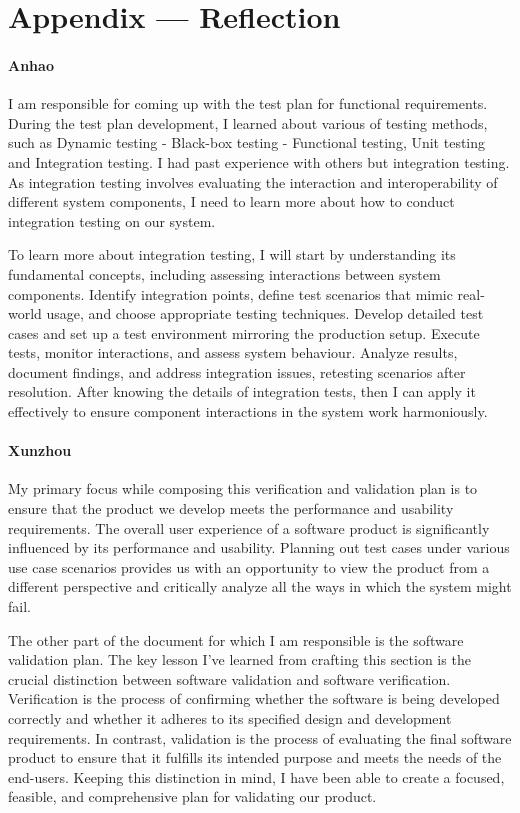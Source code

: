 \documentclass[12pt, titlepage]{article}
\begin{document}
\newpage{}
\section*{Appendix --- Reflection}

\paragraph*{Anhao}
I am responsible for coming up with the test plan for functional requirements.
During the test plan development, I learned about various of testing methods,
such as Dynamic testing - Black-box testing - Functional testing, Unit testing
and Integration testing. I had past experience with others but integration
testing. As integration testing involves evaluating the interaction and
interoperability of different system components, I need to learn more about how
to conduct integration testing on our system.

To learn more about integration testing, I will start by understanding its
fundamental concepts, including assessing interactions between system
components. Identify integration points, define test scenarios that mimic
real-world usage, and choose appropriate testing techniques. Develop detailed
test cases and set up a test environment mirroring the production setup. Execute
tests, monitor interactions, and assess system behaviour. Analyze results,
document findings, and address integration issues, retesting scenarios after
resolution. After knowing the details of integration tests, then I can apply it
effectively to ensure component interactions in the system work harmoniously.

\paragraph*{Xunzhou}
My primary focus while composing this verification and validation plan is to
ensure that the product we develop meets the performance and usability
requirements. The overall user experience of a software product is significantly
influenced by its performance and usability. Planning out test cases under
various use case scenarios provides us with an opportunity to view the product
from a different perspective and critically analyze all the ways in which the
system might fail.

The other part of the document for which I am responsible is the software
validation plan. The key lesson I've learned from crafting this section is the
crucial distinction between software validation and software verification.
Verification is the process of confirming whether the software is being
developed correctly and whether it adheres to its specified design and
development requirements. In contrast, validation is the process of evaluating
the final software product to ensure that it fulfills its intended purpose and
meets the needs of the end-users. Keeping this distinction in mind, I have been
able to create a focused, feasible, and comprehensive plan for validating our
product.
\end{document}

